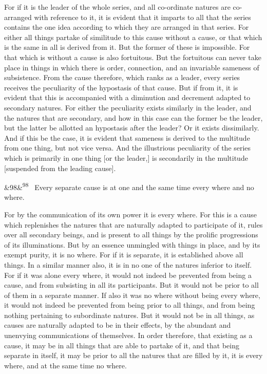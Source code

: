 \documentclass[12pt]{article}
\newcommand{\para}[1][]{\par\noindent\ifx&#1&\else\textsuperscript{\footnotesize #1}~\fi}
\begin{document}
For if it is the leader of the whole series, and all co-ordinate natures are co-arranged with reference to it, it is evident that it imparts to all that the series contains the one idea according to which they are arranged in that series. For either all things partake of similitude to this cause without a cause, or that which is the same in all is derived from it. But the former of these is impossible. For that which is without a cause is also fortuitous. But the fortuitous can never take place in things in which there is order, connection, and an invariable sameness of subsistence. From the cause therefore, which ranks as a leader, every series receives the peculiarity of the hypostasis of that cause. But if from it, it is evident that this is accompanied with a diminution and decrement adapted to secondary natures. For either the peculiarity exists similarly in the leader, and the natures that are secondary, and how in this case can the former be the leader, but the latter be allotted an hypostasis after the leader? Or it exists dissimilarly. And if this be the case, it is evident that sameness is derived to the multitude from one thing, but not vice versa. And the illustrious peculiarity of the series which is primarily in one thing [or the leader,] is secondarily in the multitude [suspended from the leading cause].

\para[98] Every separate cause is at one and the same time every where and no where.

For by the communication of its own power it is every where. For this is a cause which replenishes the natures that are naturally adapted to participate of it, rules over all secondary beings, and is present to all things by the prolific progressions of its illuminations. But by an essence unmingled with things in place, and by its exempt purity, it is no where. For if it is separate, it is established above all things. In a similar manner also, it is in no one of the natures inferior to itself. For if it was alone every where, it would not indeed be prevented from being a cause, and from subsisting in all its participants. But it would not be prior to all of them in a separate manner. If also it was no where without being every where, it would not indeed be prevented from being prior to all things, and from being nothing pertaining to subordinate natures. But it would not be in all things, as causes are naturally adapted to be in their effects, by the abundant and unenvying communications of themselves. In order therefore, that existing as a cause, it may be in all things that are able to partake of it, and that being separate in itself, it may be prior to all the natures that are filled by it, it is every where, and at the same time no where.
\end{document}

